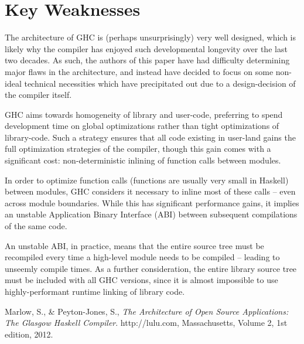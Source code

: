 \documentclass[a4paper]{article}
\begin{document}
\section{Key Weaknesses}

The architecture of GHC is (perhaps unsurprisingly) very well designed, which is likely why the compiler has enjoyed such developmental longevity over the last two decades. As such, the authors of this paper have had difficulty determining major flaws in the architecture, and instead have decided to focus on some non-ideal technical necessities which have precipitated out due to a design-decision of the compiler itself.

GHC aims towards homogeneity of library and user-code, preferring to spend development time on global optimizations rather than tight optimizations of library-code. Such a strategy ensures that all code existing in user-land gains the full optimization strategies of the compiler, though this gain comes with a significant cost: non-deterministic inlining of function calls between modules.

In order to optimize function calls (functions are usually very small in Haskell) between modules, GHC considers it necessary to inline most of these calls -- even across module boundaries. While this has significant performance gains, it implies an unstable Application Binary Interface (ABI) between subsequent compilations of the same code.

An unstable ABI, in practice, means that the entire source tree must be recompiled every time a high-level module needs to be compiled -- leading to unseemly compile times. As a further consideration, the entire library source tree must be included with all GHC versions, since it is almost impossible to use highly-performant runtime linking of library code.

\begin{thebibliography}{9}

  Marlow, S., \& Peyton-Jones, S.,
  \emph{The Architecture of Open Source Applications: The Glasgow Haskell Compiler}.
  http://lulu.com, Massachusetts,
  Volume 2,
  1st edition,
  2012.

\end{thebibliography}
\end{document}
